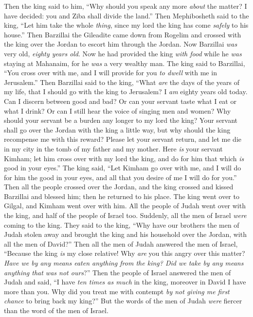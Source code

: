 \begin{biblechapter}
\verse Then the king said to him, “Why should you speak any more \textit{about} the matter? I have decided: you and Ziba shall divide the land.”
\verse Then Mephibosheth said to the king, “Let him take the whole \textit{thing}, since my lord the king has come \textit{safely} to his house.”
\verse Then Barzillai the Gileadite came down from Rogelim and crossed with the king over the Jordan to escort him through the Jordan.
\verse Now Barzillai \textit{was} very old, \textit{eighty years old}. Now he had provided the king \textit{with food} while he \textit{was} staying at Mahanaim, for he \textit{was} a very wealthy man.
\verse The king said to Barzillai, “You cross over with me, and I will provide for you \textit{to dwell} with me in Jerusalem.”
\verse Then Barzillai said to the king, “What \textit{are} the days of the years of my life, that I should go with the king to Jerusalem?
\verse I \textit{am} eighty years old today. Can I discern between good and bad? Or can your servant taste what I eat or what I drink? Or can I still hear the voice of singing men and women? Why should your servant be a burden any longer to my lord the king?
\verse Your servant shall go over the Jordan with the king a little way, but why should the king recompense me with this reward?
\verse Please let your servant return, and let me die in my city in the tomb of my father and my mother. Here \textit{is} your servant Kimham; let him cross over with my lord the king, and do for him that which \textit{is} good in your eyes.”
\verse The king said, “Let Kimham go over with me, and I will do for him the good in your eyes, and all that you desire of me I will do for you.”
\verse Then all the people crossed over the Jordan, and the king crossed and kissed Barzillai and blessed him; then he returned to his place.
\verse The king went over to Gilgal, and Kimham went over with him. All the people of Judah went over with the king, and half of the people of Israel too.
\verse Suddenly, all the men of Israel \textit{were} coming to the king. They said to the king, “Why have our brothers the men of Judah stolen away and brought the king and his household over the Jordan, with all the men of David?”
\verse Then all the men of Judah answered the men of Israel, “Because the king \textit{is} my close relative! Why \textit{are} you this angry over this matter? \textit{Have we by any means eaten \textit{anything} from the king? Did we take by any means anything that was not ours}?”
\verse Then the people of Israel answered the men of Judah and said, “I have \textit{ten times as much} in the king, moreover in David I have more than you. Why did you treat me with contempt \textit{by not giving me first chance} to bring back my king?” But the words of the men of Judah \textit{were} fiercer than the word of the men of Israel.
\end{biblechapter}

